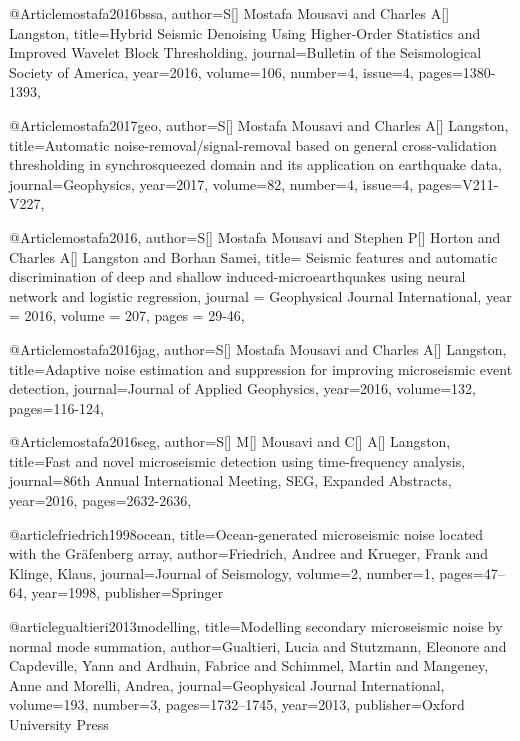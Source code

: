 @Article{mostafa2016bssa,
  author={S[] Mostafa Mousavi and Charles A[] Langston},
  title={Hybrid Seismic Denoising Using Higher-Order Statistics and Improved Wavelet Block Thresholding},
  journal={Bulletin of the Seismological Society of America},
  year=2016,
  volume=106,
  number=4,
  issue=4,
  pages={1380-1393},
}

@Article{mostafa2017geo,
  author={S[] Mostafa Mousavi and Charles A[] Langston},
  title={Automatic noise-removal/signal-removal based on general cross-validation thresholding in synchrosqueezed domain and its application on earthquake data},
  journal={Geophysics},
  year=2017,
  volume=82,
  number=4,
  issue=4,
  pages={V211-V227},
}

@Article{mostafa2016,
  author={S[] Mostafa Mousavi and Stephen P[] Horton and Charles A[] Langston and Borhan Samei},
  title={ Seismic features and automatic discrimination of deep and shallow induced-microearthquakes using neural network and logistic regression},
  journal = 	 {Geophysical Journal International},
  year = 	 2016,
  volume =	 207,
  pages =	 {29-46},
}



@Article{mostafa2016jag,
  author={S[] Mostafa Mousavi and Charles A[] Langston},
  title={Adaptive noise estimation and suppression for improving microseismic event detection},
  journal={Journal of Applied Geophysics},
  year=2016,
  volume=132,
  pages={116-124},
}

  @Article{mostafa2016seg,
  author={S[] M[] Mousavi and C[] A[] Langston},
  title={Fast and novel microseismic detection using time-frequency analysis},
  journal={86th Annual International Meeting, SEG, Expanded Abstracts},
  year=2016,
  pages={2632-2636},
}

@article{friedrich1998ocean,
  title={Ocean-generated microseismic noise located with the Gr{\"a}fenberg array},
  author={Friedrich, Andree and Krueger, Frank and Klinge, Klaus},
  journal={Journal of Seismology},
  volume={2},
  number={1},
  pages={47--64},
  year={1998},
  publisher={Springer}
}

@article{gualtieri2013modelling,
  title={Modelling secondary microseismic noise by normal mode summation},
  author={Gualtieri, Lucia and Stutzmann, Eleonore and Capdeville, Yann and Ardhuin, Fabrice and Schimmel, Martin and Mangeney, Anne and Morelli, Andrea},
  journal={Geophysical Journal International},
  volume={193},
  number={3},
  pages={1732--1745},
  year={2013},
  publisher={Oxford University Press}
}

